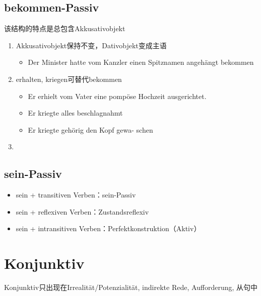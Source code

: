 \documentclass[UTF8]{report}
\begin{document}
\subsection{bekommen-Passiv}
该结构的特点是总包含Akkusativobjekt
\begin{enumerate}
    \item Akkusativobjekt保持不变，Dativobjekt变成主语
    \begin{itemize}
        \item Der Minister hatte vom Kanzler einen Spitznamen angehängt bekommen
    \end{itemize}
    \item erhalten, kriegen可替代bekommen
    \begin{itemize}
        \item Er  erhielt vom Vater  eine pompöse Hochzeit ausgerichtet.
        \item Er kriegte alles beschlagnahmt
        \item Er kriegte gehörig den Kopf gewa- schen
    \end{itemize}
    \item 
\end{enumerate}

\subsection{sein-Passiv}
\begin{itemize}
    \item sein + transitiven Verben：sein-Passiv
    \item sein + reflexiven Verben：Zustandsreflexiv
    \item sein + intransitiven Verben：Perfektkonstruktion（Aktiv）
\end{itemize}


\section{Konjunktiv}
Konjunktiv只出现在Irrealität/Potenzialität, indirekte Rede, Aufforderung, 从句中
\end{document}
